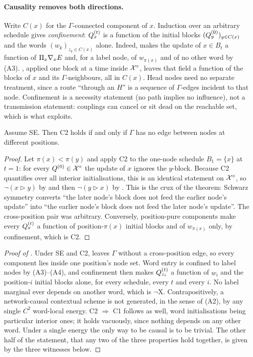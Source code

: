 \paragraph{Causality removes both directions.}
Write $C(x)$ for the $\Gamma$-connected component of $x$. Induction over an arbitrary schedule
gives \emph{confinement}: $Q_x^{(t)}$ is a function of the initial blocks
$(Q_y^{(0)})_{y \in C(x)}$ and the words $(w_k)_{z_k \in C(x)}$ alone. Indeed,
 makes the update of $x \in B_t$ a function of $\Pi_{x}\nabla_x E$ and, for
a label node, of $w_{\pi(x)}$ and of no other word by (A3). , applied one
block at a time inside $\mathcal{X}^{\circ}$, leaves that field a function of the blocks of $x$ and its
$\Gamma$-neighbours, all in $C(x)$. Head nodes need no separate treatment, since a route
``through an $H$'' is a sequence of $\Gamma$-edges incident to that node. Confinement is a
necessity statement (no path implies no influence), not a transmission statement: couplings can
cancel or sit dead on the reachable set, which is what  exploits.

\begin{proposition}
\label{app:prop-c2}
Assume SE. Then C2 holds if and only if $\Gamma$ has no edge between nodes at different
positions.
\end{proposition}

\begin{proof}
Let $\pi(x) < \pi(y)$ and apply C2 to the one-node schedule $B_1 = \{x\}$ at $t=1$: for every
$Q^{(0)} \in \mathcal{X}^{\circ}$ the update of $x$ ignores the $y$-block. Because C2 quantifies over all
interior initialisations, this is an identical statement on $\mathcal{X}^{\circ}$, so $\neg(x \rhd y)$ by
 and then $\neg(y \rhd x)$ by . This is the crux of
the theorem: Schwarz symmetry converts ``the later node's block does not feed the earlier node's
update'' into ``the earlier node's block does not feed the later node's update''. The
cross-position pair was arbitrary. Conversely, position-pure components make every $Q_x^{(t)}$
a function of position-$\pi(x)$ initial blocks and of $w_{\pi(x)}$ only, by confinement, which
is C2.
\end{proof}

\begin{proof}[Proof of ]
Under SE and C2,  leaves $\Gamma$ without a cross-position edge, so every
component lies inside one position's node set. Word entry is confined to label nodes by
(A3)--(A4), and confinement then makes $Q_{z_i}^{(t)}$ a function of $w_i$ and the
position-$i$ initial blocks alone, for every schedule, every $t$ and every $i$. No label marginal
ever depends on another word, which is $\neg$X. Contrapositively, a network-causal contextual
scheme is not generated, in the sense of (A2), by any single $C^2$ word-local energy. C2
$\Rightarrow$ C1 follows as well, word initialisations being particular interior ones; it holds
vacuously, since nothing depends on any other word. Under a single energy the only way to be
causal is to be trivial. The other half of the statement, that any two of the three properties
hold together, is given by the three witnesses below.
\end{proof}

